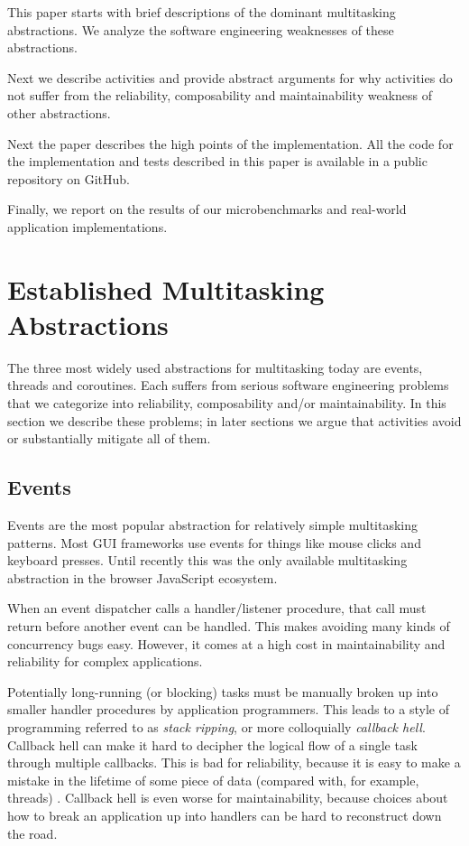 \documentclass[10pt,preprint]{sigplanconf}
\begin{document}
This paper starts with brief descriptions of the dominant multitasking abstractions.
We analyze the software engineering weaknesses of these abstractions.

Next we describe activities and provide abstract arguments for why activities do not suffer from the reliability, composability and maintainability weakness of other abstractions.

Next the paper describes the high points of the \charcoal{} implementation.
All the code for the implementation and tests described in this paper is available in a public repository on GitHub.

Finally, we report on the results of our microbenchmarks and real-world application implementations.

\section{Established Multitasking Abstractions}

The three most widely used abstractions for multitasking today are events, threads and coroutines.
Each suffers from serious software engineering problems that we categorize into reliability, composability and/or maintainability.
In this section we describe these problems; in later sections we argue that activities avoid or substantially mitigate all of them.

\subsection{Events}

Events are the most popular abstraction for relatively simple multitasking patterns.
Most GUI frameworks use events for things like mouse clicks and keyboard presses.
Until recently this was the only available multitasking abstraction in the browser JavaScript ecosystem.

When an event dispatcher calls a handler/listener procedure, that call must return before another event can be handled.
This makes avoiding many kinds of concurrency bugs easy.
However, it comes at a high cost in maintainability and reliability for complex applications.

Potentially long-running (or blocking) tasks must be manually broken up into smaller handler procedures by application programmers.
This leads to a style of programming referred to as \emph{stack ripping}\cite{Adya2002}, or more colloquially \emph{callback hell}.
Callback hell can make it hard to decipher the logical flow of a single task through multiple callbacks.
This is bad for reliability, because it is easy to make a mistake in the lifetime of some piece of data (compared with, for example, threads) \cite{Behren2003a}.
Callback hell is even worse for maintainability, because choices about how to break an application up into handlers can be hard to reconstruct down the road.
\end{document}
